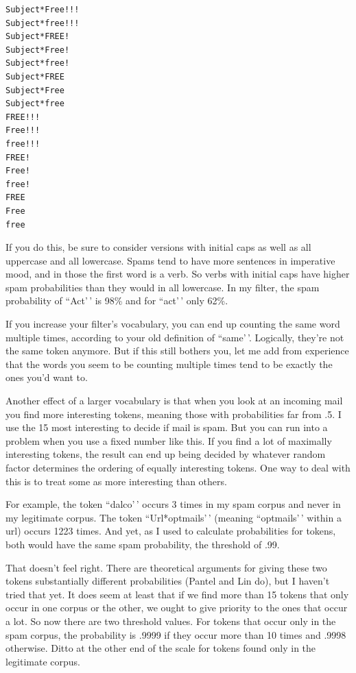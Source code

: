 \documentclass[12pt]{book}
\begin{document}
\begin{verbatim}
Subject*Free!!!
Subject*free!!!
Subject*FREE!
Subject*Free!
Subject*free!
Subject*FREE
Subject*Free
Subject*free
FREE!!!
Free!!!
free!!!
FREE!
Free!
free!
FREE
Free
free              
\end{verbatim}

If you do this, be sure to consider versions with initial caps as well
as all uppercase and all lowercase. Spams tend to have more sentences in
imperative mood, and in those the first word is a verb. So verbs with
initial caps have higher spam probabilities than they would in all
lowercase. In my filter, the spam probability of ``Act'\,' is 98\% and
for ``act'\,' only 62\%.

If you increase your filter's vocabulary, you can end up counting the
same word multiple times, according to your old definition of
``same'\,'. Logically, they're not the same token anymore. But if this
still bothers you, let me add from experience that the words you seem to
be counting multiple times tend to be exactly the ones you'd want to.

Another effect of a larger vocabulary is that when you look at an
incoming mail you find more interesting tokens, meaning those with
probabilities far from .5. I use the 15 most interesting to decide if
mail is spam. But you can run into a problem when you use a fixed number
like this. If you find a lot of maximally interesting tokens, the result
can end up being decided by whatever random factor determines the
ordering of equally interesting tokens. One way to deal with this is to
treat some as more interesting than others.

For example, the token ``dalco'\,' occurs 3 times in my spam corpus and
never in my legitimate corpus. The token ``Url*optmails'\,' (meaning
``optmails'\,' within a url) occurs 1223 times. And yet, as I used to
calculate probabilities for tokens, both would have the same spam
probability, the threshold of .99.

That doesn't feel right. There are theoretical arguments for giving
these two tokens substantially different probabilities (Pantel and Lin
do), but I haven't tried that yet. It does seem at least that if we find
more than 15 tokens that only occur in one corpus or the other, we ought
to give priority to the ones that occur a lot. So now there are two
threshold values. For tokens that occur only in the spam corpus, the
probability is .9999 if they occur more than 10 times and .9998
otherwise. Ditto at the other end of the scale for tokens found only in
the legitimate corpus.
\end{document}

